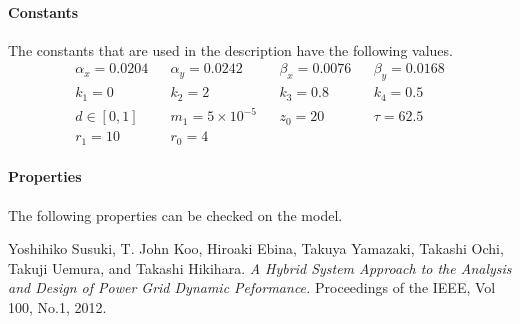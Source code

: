 \documentclass{article}
\begin{document}
\paragraph{Constants} The constants that are used in the description have the
following values. 
\begin{align*}
\alpha_x = 0.0204 && \alpha_y = 0.0242 && \beta_x = 0.0076 && \beta_y = 0.0168
\\
k_1 = 0 && k_2 = 2 && k_3 = 0.8 && k_4 = 0.5 \\
d\in [0,1] && m_1 = 5\times 10^{-5} && z_0 = 20 && \tau = 62.5 \\
r_1 = 10 && r_0 = 4
\end{align*}
\paragraph{Properties}
The following properties can be checked on the model. 


\begin{thebibliography}{1}
 Yoshihiko Susuki, T. John Koo, Hiroaki Ebina, Takuya Yamazaki,
Takashi Ochi, Takuji Uemura, and Takashi Hikihara. {\em A Hybrid System
Approach to the Analysis and Design of Power Grid Dynamic Peformance.}
Proceedings of the IEEE, Vol 100, No.1, 2012.


  \end{thebibliography}
\end{document}
